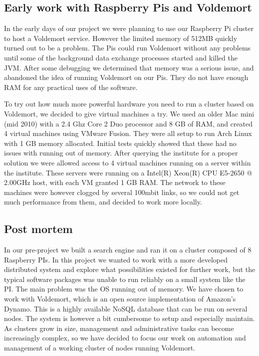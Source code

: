 \subsection*{Early work with Raspberry Pis and Voldemort}
In the early days of our project we were planning to use our Raspberry Pi cluster to host a Voldemort service. However the limited memory of 512MB quickly turned out to be a problem. The Pis could run Voldemort without any problems until some of the background data exchange processes started and killed the JVM. After some debugging we determined that memory was a serious issue, and abandoned the idea of running Voldemort on our Pis. They do not have enough RAM for any practical uses of the software.

To try out how much more powerful hardware you need to run a cluster based on Voldemort, we decided to give virtual machines a try. We used an older Mac mini (mid 2010) with a 2.4 Ghz Core 2 Duo processor and 8 GB of RAM, and created 4 virtual machines using VMware Fusion. They were all setup to run Arch Linux with 1 GB memory allocated. Initial tests quickly showed that these had no issues with running out of memory. After querying the institute for a proper solution we were allowed access to 4 virtual machines running on a server within the institute. These servers were running on a Intel(R) Xeon(R) CPU E5-2650 @ 2.00GHz host, with each VM granted 1 GB RAM. The network to these machines were however clogged by several 100mbit links, so we could not get much performance from them, and decided to work more locally.

\subsection*{Post mortem}
In our pre-project we built a search engine and ran it on a cluster composed of 8 Raspberry PIs. In this project we wanted to work with a more developed distributed system and explore what possibilities existed for further work, but the typical software packages was unable to run reliably on a small system like the PI. The main problem was the OS running out of memory.
We have chosen to work with Voldemort, which is an open source implementation of Amazon’s Dynamo. This is a highly available NoSQL database that can be run on several nodes. The system is however a bit cumbersome to setup and especially maintain.
As clusters grow in size, management and administrative tasks can become increasingly complex, so we have decided to focus our work on automation and management of a working cluster of nodes running Voldemort. 
